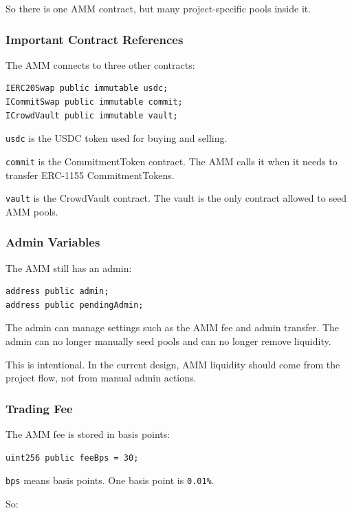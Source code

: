 \documentclass[11pt,a4paper]{article}
\begin{document}
So there is one AMM contract, but many project-specific pools inside it.

\subsubsection{Important Contract References}

The AMM connects to three other contracts:

\begin{lstlisting}
IERC20Swap public immutable usdc;
ICommitSwap public immutable commit;
ICrowdVault public immutable vault;
\end{lstlisting}

\texttt{usdc} is the USDC token used for buying and selling.

\texttt{commit} is the CommitmentToken contract. The AMM calls it when it needs to transfer ERC-1155 CommitmentTokens.

\texttt{vault} is the CrowdVault contract. The vault is the only contract allowed to seed AMM pools.

\subsubsection{Admin Variables}

The AMM still has an admin:

\begin{lstlisting}
address public admin;
address public pendingAdmin;
\end{lstlisting}

The admin can manage settings such as the AMM fee and admin transfer. The admin can no longer manually seed pools and can no longer remove liquidity.

This is intentional. In the current design, AMM liquidity should come from the project flow, not from manual admin actions.

\subsubsection{Trading Fee}

The AMM fee is stored in basis points:

\begin{lstlisting}
uint256 public feeBps = 30;
\end{lstlisting}

\texttt{bps} means basis points. One basis point is \texttt{0.01\%}.

So:
\end{document}
